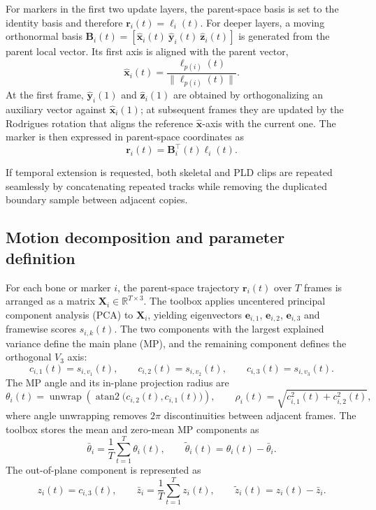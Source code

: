 For markers in the first two update layers, the parent-space basis is set to the identity basis and therefore $\mathbf{r}_i(t)=\boldsymbol{\ell}_i(t)$. For deeper layers, a moving orthonormal basis $\mathbf{B}_i(t)=\left[\hat{\mathbf{x}}_i(t)\ \hat{\mathbf{y}}_i(t)\ \hat{\mathbf{z}}_i(t)\right]$ is generated from the parent local vector. Its first axis is aligned with the parent vector,
\begin{equation}
\hat{\mathbf{x}}_i(t)=\frac{\boldsymbol{\ell}_{p(i)}(t)}{\|\boldsymbol{\ell}_{p(i)}(t)\|}.
\end{equation}
At the first frame, $\hat{\mathbf{y}}_i(1)$ and $\hat{\mathbf{z}}_i(1)$ are obtained by orthogonalizing an auxiliary vector against $\hat{\mathbf{x}}_i(1)$; at subsequent frames they are updated by the Rodrigues rotation that aligns the reference $\hat{\mathbf{x}}$-axis with the current one. The marker is then expressed in parent-space coordinates as
\begin{equation}
\mathbf{r}_i(t)=\mathbf{B}_i^\top(t)\boldsymbol{\ell}_i(t).
\end{equation}

If temporal extension is requested, both skeletal and PLD clips are repeated seamlessly by concatenating repeated tracks while removing the duplicated boundary sample between adjacent copies.

\subsection{Motion decomposition and parameter definition}\label{subsec:methods-decomposition}
For each bone or marker $i$, the parent-space trajectory $\mathbf{r}_i(t)$ over $T$ frames is arranged as a matrix $\mathbf{X}_i\in\mathbb{R}^{T\times 3}$. The toolbox applies uncentered principal component analysis (PCA) to $\mathbf{X}_i$, yielding eigenvectors $\mathbf{e}_{i,1}$, $\mathbf{e}_{i,2}$, $\mathbf{e}_{i,3}$ and framewise scores $s_{i,k}(t)$. The two components with the largest explained variance define the main plane (MP), and the remaining component defines the orthogonal $V_3$ axis:
\begin{equation}
c_{i,1}(t)=s_{i,v_1}(t), \qquad
c_{i,2}(t)=s_{i,v_2}(t), \qquad
c_{i,3}(t)=s_{i,v_3}(t).
\end{equation}
The MP angle and its in-plane projection radius are
\begin{equation}
\theta_i(t)=\operatorname{unwrap}\!\left(\operatorname{atan2}\!\bigl(c_{i,2}(t),c_{i,1}(t)\bigr)\right),
\qquad
\rho_i(t)=\sqrt{c_{i,1}^2(t)+c_{i,2}^2(t)},
\end{equation}
where angle unwrapping removes $2\pi$ discontinuities between adjacent frames. The toolbox stores the mean and zero-mean MP components as
\begin{equation}
\bar{\theta}_i=\frac{1}{T}\sum_{t=1}^{T}\theta_i(t), \qquad
\tilde{\theta}_i(t)=\theta_i(t)-\bar{\theta}_i.
\end{equation}
The out-of-plane component is represented as
\begin{equation}
z_i(t)=c_{i,3}(t), \qquad
\bar{z}_i=\frac{1}{T}\sum_{t=1}^{T} z_i(t), \qquad
\tilde{z}_i(t)=z_i(t)-\bar{z}_i.
\end{equation}


